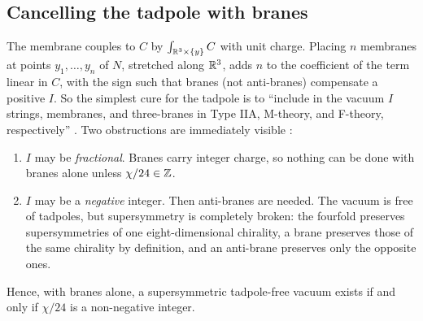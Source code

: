 \subsection{Cancelling the tadpole with branes}
The membrane couples to $C$ by $\int_{\mathbb{R}^3\times\{y\}}C$ with unit charge. Placing $n$
membranes at points $y_1,\dots,y_n$ of $N$, stretched along $\mathbb{R}^3$, adds $n$ to the
coefficient of the term linear in $C$, with the sign such that branes (not anti-branes)
compensate a positive $I$. So the simplest cure for the tadpole is to ``include in the vacuum
$I$ strings, membranes, and three-branes in Type IIA, M-theory, and F-theory, respectively''
. Two obstructions are immediately visible
:
\begin{enumerate}[leftmargin=2em]
\item $I$ may be \emph{fractional}. Branes carry integer charge, so nothing can be done with
 branes alone unless $\chi/24\in\mathbb{Z}$.
\item $I$ may be a \emph{negative} integer. Then anti-branes are needed. The vacuum is free
 of tadpoles, but supersymmetry is completely broken: the fourfold preserves supersymmetries
 of one eight-dimensional chirality, a brane preserves those of the same chirality by
 definition, and an anti-brane preserves only the opposite ones.
\end{enumerate}
Hence, with branes alone, a supersymmetric tadpole-free vacuum exists if and only if
$\chi/24$ is a non-negative integer. \TL

